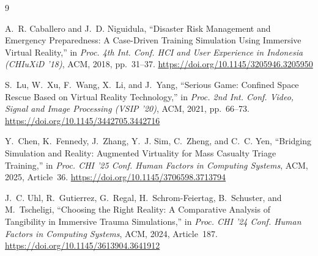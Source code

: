 \documentclass[10pt, twocolumn]{article}
\begin{document}
\begin{thebibliography}{9}

A.~R. Caballero and J.~D. Niguidula,
``Disaster Risk Management and Emergency Preparedness: A Case-Driven Training
Simulation Using Immersive Virtual Reality,''
in \textit{Proc. 4th Int. Conf. HCI and User Experience in Indonesia
(CHIuXiD '18)}, ACM, 2018, pp.~31--37.
\url{https://doi.org/10.1145/3205946.3205950}

S.~Lu, W.~Xu, F.~Wang, X.~Li, and J.~Yang,
``Serious Game: Confined Space Rescue Based on Virtual Reality Technology,''
in \textit{Proc. 2nd Int. Conf. Video, Signal and Image Processing (VSIP '20)},
ACM, 2021, pp.~66--73.
\url{https://doi.org/10.1145/3442705.3442716}

Y.~Chen, K.~Fennedy, J.~Zhang, Y.~J. Sim, C.~Zheng, and C.~C. Yen,
``Bridging Simulation and Reality: Augmented Virtuality for Mass Casualty Triage
Training,''
in \textit{Proc. CHI '25 Conf. Human Factors in Computing Systems},
ACM, 2025, Article~36.
\url{https://doi.org/10.1145/3706598.3713794}

J.~C. Uhl, R.~Gutierrez, G.~Regal, H.~Schrom-Feiertag, B.~Schuster, and
M.~Tscheligi,
``Choosing the Right Reality: A Comparative Analysis of Tangibility in Immersive
Trauma Simulations,''
in \textit{Proc. CHI '24 Conf. Human Factors in Computing Systems},
ACM, 2024, Article~187.
\url{https://doi.org/10.1145/3613904.3641912}

\end{thebibliography}
\end{document}
